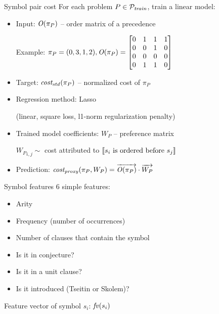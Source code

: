 \documentclass[notes]{beamer}
\begin{document}
\begin{frame}{Symbol pair cost}
For each problem $P \in \mathcal{P}_{\mathit{train}}$, train a linear model:

\begin{itemize}
	\item Input: $\operatorname{\mathit{O}}(\pi_P)$ -- order matrix of a precedence
	
	Example: $\pi_P = (0, 3, 1, 2),
	\operatorname{\mathit{O}}(\pi_P) =
	\begin{bmatrix}
	0 & 1 & 1 & 1 \\
	0 & 0 & 1 & 0 \\
	0 & 0 & 0 & 0 \\
	0 & 1 & 1 & 0
	\end{bmatrix}
	$
	\item Target: $\operatorname{\mathit{cost_{std}}}(\pi_P)$ -- normalized cost of $\pi_P$
	\item Regression method: Lasso
	
	(linear, square loss, l1-norm regularization penalty)
	\item Trained model coefficients: $W_P$ -- preference matrix
	
	${W_P}_{i,j} \sim$ cost attributed to $\left \llbracket s_i\text{ is ordered before }s_j \right \rrbracket$
	\item Prediction: $\operatorname{\mathit{cost_{proxy}}}(\pi_P, W_P) = \overrightarrow{\operatorname{\mathit{O}}(\pi_P)} \cdot \overrightarrow{W_P}$
\end{itemize}
\end{frame}

\begin{frame}{Symbol features}
6 simple features:
\begin{itemize}
	\item Arity
	\item Frequency (number of occurrences)
	\item Number of clauses that contain the symbol
	\item Is it in conjecture?
	\item Is it in a unit clause?
	\item Is it introduced (Tseitin or Skolem)?
\end{itemize}
Feature vector of symbol $s_i$: $\mathit{fv}(s_i)$
\end{frame}
\end{document}
